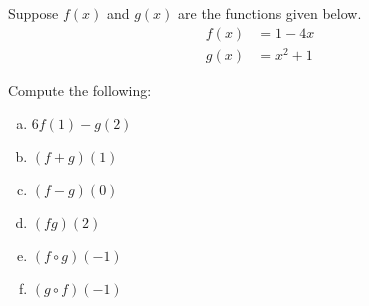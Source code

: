 \documentclass[11pt,letterpaper]{article}
\begin{document}
\newpage



 Suppose $f(x)$ and $g(x)$ are the functions given below. 
	\[
	\begin{aligned}
	f(x)&= 1 - 4x \\[0.3cm]
	g(x)&= x^2 + 1
	\end{aligned}
	\]

Compute the following: \pspace
        \begin{enumerate}[(a)]
        \item $6f(1) - g(2)$ \vfill
        \item $(f + g)(1)$ \vfill
        \item $(f - g)(0)$ \vfill
        \item $(fg)(2)$ \vfill
        \item $(f \circ g)(-1)$ \vfill
        \item $(g \circ f)(-1)$ \vfill
        \end{enumerate} 
\end{document}
